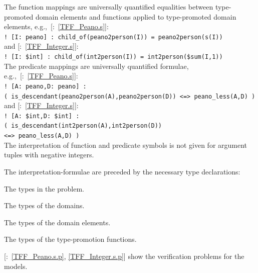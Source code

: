 \documentclass{easychair}
\newcommand{\smalltt}[1]{\small \texttt{#1}}
\newcommand{\example}{{\scriptsize \faFile[regular]}}
\newenvironment{packed_itemize}{
\vspace*{-0.3em}
\begin{itemize}
\setlength{\partopsep}{0pt}
\setlength{\itemsep}{1pt}
\setlength{\parskip}{0pt}
\setlength{\parsep}{0pt}
}{\end{itemize}}
\begin{document}
The function mappings are universally quantified equalities between type-promoted domain 
elements and functions applied to type-promoted domain elements, 
e.g.,~[\example{}:~\ref{TFF_Peano.s}]:\\
\hspace*{0.5cm}\smalltt{! [I: peano] : child\_of(peano2person(I)) = peano2person(s(I))}\\
and [\example{}:~\ref{TFF_Integer.s}]:\\
\hspace*{0.5cm}\smalltt{! [I: \$int] : child\_of(int2person(I)) = int2person(\$sum(I,1))}\\
The predicate mappings are universally quantified formulae, 
e.g.,~[\example{}:~\ref{TFF_Peano.s}]:\\
\hspace*{0.5cm}\smalltt{! [A: peano,D: peano] :}\\
\hspace*{0.9cm}\smalltt{( is\_descendant(peano2person(A),peano2person(D)) <=> peano\_less(A,D) )}\\
and [\example{}:~\ref{TFF_Integer.s}]:\\
\hspace*{0.5cm}\smalltt{! [A: \$int,D: \$int] :}\\
\hspace*{0.9cm}\smalltt{( is\_descendant(int2person(A),int2person(D))}\\
\hspace*{0.5cm}\smalltt{<=> peano\_less(A,D) )}\\
The interpretation of function and predicate symbols is not given for argument tuples
with negative integers.

The interpretation-formulae are preceded by the necessary type declarations:
\begin{packed_itemize}
\item The types in the problem.
\item The types of the domains.
\item The types of the domain elements.
\item The types of the type-promotion functions.
\end{packed_itemize}

[\example{}:~\ref{TFF_Peano.s.p}, \ref{TFF_Integer.s.p}] show the 
verification problems for the models.

\end{document}
